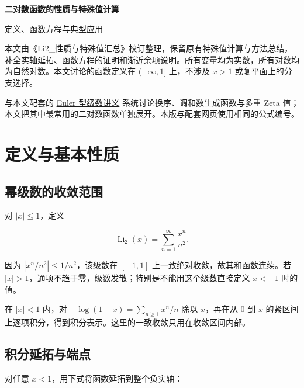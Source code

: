 \documentclass[11pt,a4paper]{article}
\begin{document}
\begin{center}
{\LARGE\bfseries 二对数函数的性质与特殊值计算\par}
\vspace{8pt}
{\normalsize 定义、函数方程与典型应用\par}
\end{center}
\vspace{10pt}
本文由《Li2\_性质与特殊值汇总》校订整理，保留原有特殊值计算与方法总结，补全实轴延拓、函数方程的证明和渐近余项说明。所有变量均为实数，所有对数均为自然对数。本文讨论的函数定义在 \((-\infty,1]\) 上，不涉及 \(x>1\) 或复平面上的分支选择。

与本文配套的 \href{https://vincent-arqain.github.io/math-notes/notes/890e1516e64e21a2fb2248b4/}{Euler 型级数讲义} 系统讨论换序、调和数生成函数与多重 Zeta 值；本文把其中最常用的二对数函数单独展开。本版与配套网页使用相同的公式编号。

\hypertarget{ux5b9aux4e49ux4e0eux57faux672cux6027ux8d28}{%
\section{定义与基本性质}\label{ux5b9aux4e49ux4e0eux57faux672cux6027ux8d28}}

\hypertarget{ux5e42ux7ea7ux6570ux7684ux6536ux655bux8303ux56f4}{%
\subsection{幂级数的收敛范围}\label{ux5e42ux7ea7ux6570ux7684ux6536ux655bux8303ux56f4}}

对 \(|x|\leqslant1\)，定义

\[
\operatorname{Li}_2(x)=\sum_{n=1}^{\infty}\frac{x^n}{n^2}.
\]

因为 \(|x^n/n^2|\leqslant1/n^2\)，该级数在 \([-1,1]\) 上一致绝对收敛，故其和函数连续。若 \(|x|>1\)，通项不趋于零，级数发散；特别是不能用这个级数直接定义 \(x<-1\) 时的值。

在 \(|x|<1\) 内，对 \(-\log(1-x)=\sum_{n\geqslant1}x^n/n\) 除以 \(x\)，再在从 \(0\) 到 \(x\) 的紧区间上逐项积分，得到积分表示。这里的一致收敛只用在收敛区间内部。

\hypertarget{ux79efux5206ux5ef6ux62d3ux4e0eux7aefux70b9}{%
\subsection{积分延拓与端点}\label{ux79efux5206ux5ef6ux62d3ux4e0eux7aefux70b9}}

对任意 \(x<1\)，用下式将函数延拓到整个负实轴：
\end{document}
